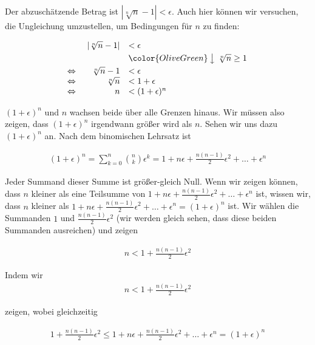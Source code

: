 \documentclass[fontsize=9pt,
               parskip=half-,
               DIV=14,
               listof=chapterentry,
               tocflat]{scrbook}
\begin{document}
\begin{solutionprocess*}
Der abzuschätzende Betrag ist $\left|{\sqrt[{n}]{n}}-1\right|<\epsilon $. Auch hier können wir versuchen, die Ungleichung umzustellen, um Bedingungen für $n$ zu finden:

\begin{align*}
{\begin{array}{rrl}&\left|{\sqrt[{n}]{n}}-1\right|&<\epsilon \\[0.3em]&&{\color {OliveGreen}\left\downarrow \ {\sqrt[{n}]{n}}\geq 1\right.}\\[0.3em]\Leftrightarrow \ &{\sqrt[{n}]{n}}-1&<\epsilon \\\Leftrightarrow \ &{\sqrt[{n}]{n}}&<1+\epsilon \\\Leftrightarrow \ &n&<(1+\epsilon )^{n}\\\end{array}}
\end{align*}

$(1+\epsilon )^{n}$ und $n$ wachsen beide über alle Grenzen hinaus. Wir müssen also zeigen, dass $(1+\epsilon )^{n}$ irgendwann größer wird als $n$. Sehen wir uns dazu $(1+\epsilon )^{n}$ an. Nach dem binomischen Lehrsatz ist

\begin{align*}
(1+\epsilon )^{n}=\sum _{k=0}^{n}{\binom {n}{k}}\epsilon ^{k}=1+n\epsilon +{\frac {n(n-1)}{2}}\epsilon ^{2}+\ldots +\epsilon ^{n}
\end{align*}

Jeder Summand dieser Summe ist größer-gleich Null. Wenn wir zeigen können, dass $n$ kleiner als eine Teilsumme von $1+n\epsilon +{\frac {n(n-1)}{2}}\epsilon ^{2}+\ldots +\epsilon ^{n}$ ist, wissen wir, dass $n$ kleiner als $1+n\epsilon +{\frac {n(n-1)}{2}}\epsilon ^{2}+\ldots +\epsilon ^{n}=(1+\epsilon )^{n}$ ist. Wir wählen die Summanden $1$ und ${\tfrac {n(n-1)}{2}}\epsilon ^{2}$ (wir werden gleich sehen, dass diese beiden Summanden ausreichen) und zeigen

\begin{align*}
n<1+{\frac {n(n-1)}{2}}\epsilon ^{2}
\end{align*}

 Indem wir \begin{align*}
n<1+{\frac {n(n-1)}{2}}\epsilon ^{2}
\end{align*}

zeigen, wobei gleichzeitig

\begin{align*}
1+{\frac {n(n-1)}{2}}\epsilon ^{2}\leq 1+n\epsilon +{\frac {n(n-1)}{2}}\epsilon ^{2}+\ldots +\epsilon ^{n}=(1+\epsilon )^{n}
\end{align*}


\end{solutionprocess*}
\end{document}
